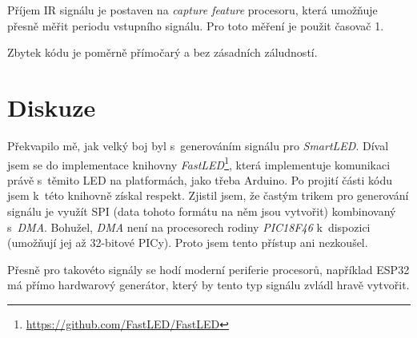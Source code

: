 \documentclass[12pt,a4paper]{article}
\begin{document}
Příjem IR signálu je postaven na \textit{capture feature} procesoru, která
umožňuje přesně měřit periodu vstupního signálu. Pro toto měření je použit
časovač 1.

Zbytek kódu je poměrně přímočarý a bez zásadních záludností.

\section{Diskuze}

Překvapilo mě, jak velký boj byl s~generováním signálu pro \textit{SmartLED}.
Díval jsem se do implementace knihovny
\textit{FastLED}\footnote{\url{https://github.com/FastLED/FastLED}}, která
implementuje komunikaci právě s~těmito LED na platformách, jako třeba Arduino.
Po projití části kódu jsem k~této knihovně získal respekt. Zjistil jsem, že
častým trikem pro generování signálu je využít SPI (data tohoto formátu na něm
jsou vytvořit) kombinovaný s~\textit{DMA}. Bohužel, \textit{DMA} není na
procesorech rodiny \textit{PIC18F46} k~dispozici (umožňují jej až 32-bitové
PICy). Proto jsem tento přístup ani nezkoušel.

Přesně pro takovéto signály se hodí moderní periferie procesorů, například
ESP32 má přímo hardwarový generátor, který by tento typ signálu zvládl hravě
vytvořit.
\end{document}
